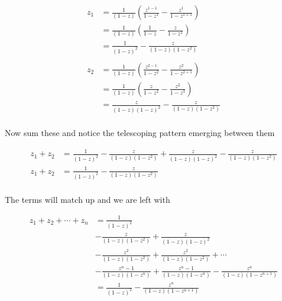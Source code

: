 \begin{enumerate}
	      \begin{align*}
		      z_1 & = \frac{1}{(1 - z)} \left( \frac{z^{1 - 1}}{1 - z^{1}} - \frac{z^1}{1 - z^{1 + 1}} \right) \\
		          & = \frac{1}{(1 - z)} \left( \frac{1}{1 - z} - \frac{z}{1 - z^{2}} \right)                   \\
		          & = \frac{1}{(1 - z)^2} - \frac{z}{(1 - z)(1 - z^{2})}                                       \\
		      \\
		      z_2 & = \frac{1}{(1 - z)} \left( \frac{z^{2 - 1}}{1 - z^{2}} - \frac{z^2}{1 - z^{2 + 1}} \right) \\
		          & = \frac{1}{(1 - z)} \left( \frac{z}{1 - z^2} - \frac{z^2}{1 - z^{3}} \right)               \\
		          & = \frac{z}{(1 - z)(1 - z)^2} - \frac{z}{(1 - z)(1 - z^{2})}                                \\
	      \end{align*}

	      Now sum these and notice the telescoping pattern emerging between them

	      \begin{align*}
		      z_1 + z_2 & = \frac{1}{(1 - z)^2} - \frac{z}{(1 - z)(1 - z^{2})} + \frac{z}{(1 - z)(1 - z)^2} - \frac{z}{(1 - z)(1 - z^{2})} \\
		      z_1 + z_2 & = \frac{1}{(1 - z)^2} - \frac{z}{(1 - z)(1 - z^{2})}                                                             \\
	      \end{align*}

	      The terms will match up and we are left with

	      \begin{align*}
		      z_1 + z_2 + \cdots + z_n & = \frac{1}{(1 - z)^2}                                                                                     \\
		                               & - \frac{z}{(1 - z)(1 - z^{2})} + \frac{z}{(1 - z)(1 - z)^2}                                               \\
		                               & - \frac{z^2}{(1 - z)(1 - z^{2})} + \frac{z^2}{(1 - z)(1 - z^{2})} + \cdots                                \\
		                               & - \frac{z^n-1}{(1 - z)(1 - z^{n})} +\frac{z^n-1}{(1 - z)(1 - z^{n})} - \frac{z^n}{(1 - z)(1 - z^{n + 1})} \\
		                               & = \frac{1}{(1 - z)^2} - \frac{z^n}{(1 - z)(1 - z^{n + 1})}                                                \\
	      \end{align*}


\end{enumerate}
